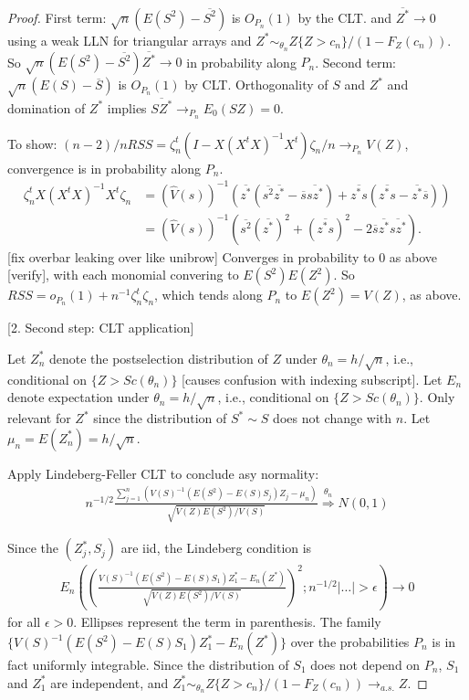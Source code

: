 \documentclass{article}
\newcommand{\E}{E}
\renewcommand{\P}{P}
\newcommand{\V}{V}
\newcommand{\mean}[1]{\overline{#1}}
\newcommand{\sel}[1]{#1^*}
\begin{document}
\begin{proof}
  First term: $\sqrt{n}\left(\E(S^2)-\mean{S^2}\right)$ is $O_{P_n}(1)$
  by the CLT.  and $\mean{\sel{Z}}\to 0$ using a weak LLN for
  triangular arrays and
  $\sel Z \sim_{\theta_n} Z\{Z>c_n\}/(1-F_Z(c_n))$. So
  $\sqrt{n}\left(\E(S^2)-\mean{S^2}\right)\mean{\sel{Z}}\to 0$ in
  probability along $P_n$. Second term:
  $\sqrt{n}\left(\E(S)-\mean{S}\right)$ is $O_{P_n}(1)$ by CLT. Orthogonality
  of $S$ and $\sel{Z}$ and domination of $\sel{Z}$ implies
  $\mean{S\sel{Z}}\to_{P_n}\E_0(SZ)=0$.

  To show:
  $(n-2)/nRSS=\zeta_n^t(I-X(X^tX)^{-1}X^t)\zeta_n/n \to_{\P_n}\V(Z)$,
  convergence is in probability along $\P_n$. 
  \begin{align}
    \zeta_n^tX(X^tX)^{-1}X^t\zeta_n &= (\hat{\V}(s))^{-1}\left(\mean{\sel{z}}(\mean{s^2}\mean{\sel{z}}-\mean{s}\mean{s\sel{z}})+\mean{\sel{z}s}(\mean{\sel{z}s}-\mean{\sel{z}}\mean{s}) \right)\\
    &= (\hat{\V}(s))^{-1}\left(\mean{s^2}(\mean{\sel{z}})^2 + (\mean{\sel{z}s})^2 - 2\mean{s}\mean{\sel{z}}\mean{s\sel{z}}\right).
  \end{align}[fix overbar leaking over like unibrow]
  Converges in probability to $0$ as above [verify], with each
  monomial convering to $\E(S^2)\E(Z^2)$. So $RSS= o_{\P_n}(1)+ n^{-1}\zeta_n^t\zeta_n$, which tends along $\P_n$ to $\E(Z^2)=\V(Z)$, as above.
  
  [2. Second step: CLT application]

  Let $\sel Z_n$ denote the postselection distribution of $Z$ under $\theta_n=h/\sqrt{n}$, i.e., conditional on $\{Z>Sc(\theta_n)\}$ [causes confusion with indexing subscript]. Let $E_n$ denote expectation under $\theta_n=h/\sqrt{n}$, i.e., conditional on $\{Z>Sc(\theta_n)\}$. Only relevant for $\sel Z$ since the distribution of $\sel S\sim S$ does not change with $n$.  Let  $\mu_n=\E(\sel Z_n)=h/\sqrt{n}$.

  Apply Lindeberg-Feller CLT to conclude asy normality:
  \begin{align}
    n^{-1/2}\frac{\sum_{j=1}^n\left(\V(S)^{-1}(\E(S^2)-\E(S)S_j)Z_j-\mu_n\right)}{\sqrt{\V(Z)\E(S^2)/\V(S)}} \overset{\theta_n}{\Rightarrow} N(0,1)
  \end{align}
  
  Since the $(\sel Z_j,S_j)$ are iid, the Lindeberg condition is
  \begin{align}
    \E_n\left(\left( \frac{\V(S)^{-1}(\E(S^2)-\E(S)S_1)\sel{Z_1}-\E_n(\sel Z)}{\sqrt{\V(Z)\E(S^2)/\V(S)}}  \right)^2; n^{-1/2}|\ldots|>\epsilon\right) \to 0
  \end{align}
  for all $\epsilon>0$. Ellipses represent the term in parenthesis. The family $\{\V(S)^{-1}(\E(S^2)-\E(S)S_1)\sel{Z_1}-\E_n(\sel Z)\}$ over the probabilities $\P_n$ is in fact uniformly integrable. Since the distribution of $S_1$ does not depend on $\P_n$, $S_1$ and $\sel Z_1$ are independent, and $\sel Z_1 \sim_{\theta_n} Z\{Z>c_n\}/(1-F_Z(c_n)) \to_{a.s.} Z$.



\end{proof}
\end{document}
